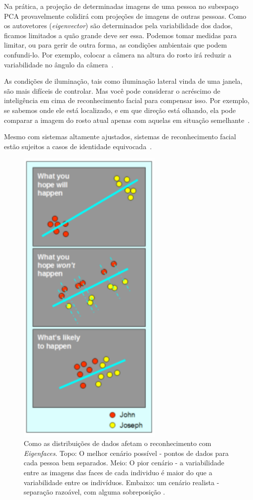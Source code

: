 Na prática, a projeção de determinadas imagens de uma pessoa no subespaço PCA provavelmente colidirá com projeções de imagens de outras pessoas. Como os autovetores (\textit{eigenvector}) são determinados pela variabilidade dos dados, ficamos limitados a quão grande deve ser essa. Podemos tomar medidas para limitar, ou para gerir de outra forma, as condições ambientais que podem confundi-lo. Por exemplo, colocar a câmera na altura do rosto irá reduzir a variabilidade no ângulo da câmera~\cite{hewitt}.

As condições de iluminação, tais como iluminação lateral vinda de uma janela, são mais difíceis de controlar. Mas você pode considerar o acréscimo de inteligência em cima de reconhecimento facial para compensar isso. Por exemplo, se sabemos onde ele está localizado, e em que direção está olhando, ela pode comparar a imagem do rosto atual apenas com aquelas em situação semelhante~\cite{hewitt}.

Mesmo com sistemas altamente ajustados, sistemas de reconhecimento facial estão sujeitos a casos de identidade equivocada~\cite{hewitt}.

	\begin{figure}[hbt]
		\begin{center}
			\includegraphics[width=7cm]{figuras/2.FundamentacaoTeorica/espacoPCA.png}
		\end{center}
		\caption{Como as distribuições de dados afetam o reconhecimento com \textit{Eigenfaces}. Topo: O melhor cenário possível - pontos de dados para cada pessoa bem separados. Meio: O pior cenário - a variabilidade entre as imagens das faces de cada individuo é maior do que a variabilidade entre os indivíduos. Embaixo: um cenário realista - separação razoável, com alguma sobreposição \cite{hewitt}.}
		\label{exemploEspacoPCA}
	\end{figure}


